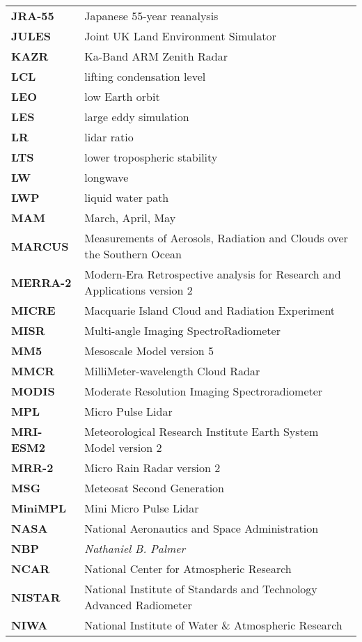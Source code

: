 \begin{longtable}{@{}p{2cm}p{20cm}}
\textbf{JRA-55} & Japanese 55-year reanalysis\\
\textbf{JULES} & Joint UK Land Environment Simulator\\
\textbf{KAZR} & Ka-Band ARM Zenith Radar\\
\textbf{LCL} & lifting condensation level\\
\textbf{LEO} & low Earth orbit\\
\textbf{LES} & large eddy simulation\\
\textbf{LR} & lidar ratio\\
\textbf{LTS} & lower tropospheric stability\\
\textbf{LW} & longwave\\
\textbf{LWP} & liquid water path\\
\textbf{MAM} & March, April, May\\
\textbf{MARCUS} & Measurements of Aerosols, Radiation and Clouds over the
Southern Ocean\\
\textbf{MERRA-2} & Modern-Era Retrospective analysis for Research and
Applications version 2\\
\textbf{MICRE} & Macquarie Island Cloud and Radiation Experiment\\
\textbf{MISR} & Multi-angle Imaging SpectroRadiometer\\
\textbf{MM5} & Mesoscale Model version 5\\
\textbf{MMCR} & MilliMeter-wavelength Cloud Radar\\
\textbf{MODIS} & Moderate Resolution Imaging Spectroradiometer\\
\textbf{MPL} & Micro Pulse Lidar\\
\textbf{MRI-ESM2} & Meteorological Research Institute Earth System Model version
2\\
\textbf{MRR-2} & Micro Rain Radar version 2\\
\textbf{MSG} & Meteosat Second Generation\\
\textbf{MiniMPL} & Mini Micro Pulse Lidar\\
\textbf{NASA} & National Aeronautics and Space Administration\\
\textbf{NBP} & \textit{Nathaniel B. Palmer}\\
\textbf{NCAR} & National Center for Atmospheric Research\\
\textbf{NISTAR} & National Institute of Standards and Technology Advanced
Radiometer\\
\textbf{NIWA} & National Institute of Water \& Atmospheric Research\\

\end{longtable}
